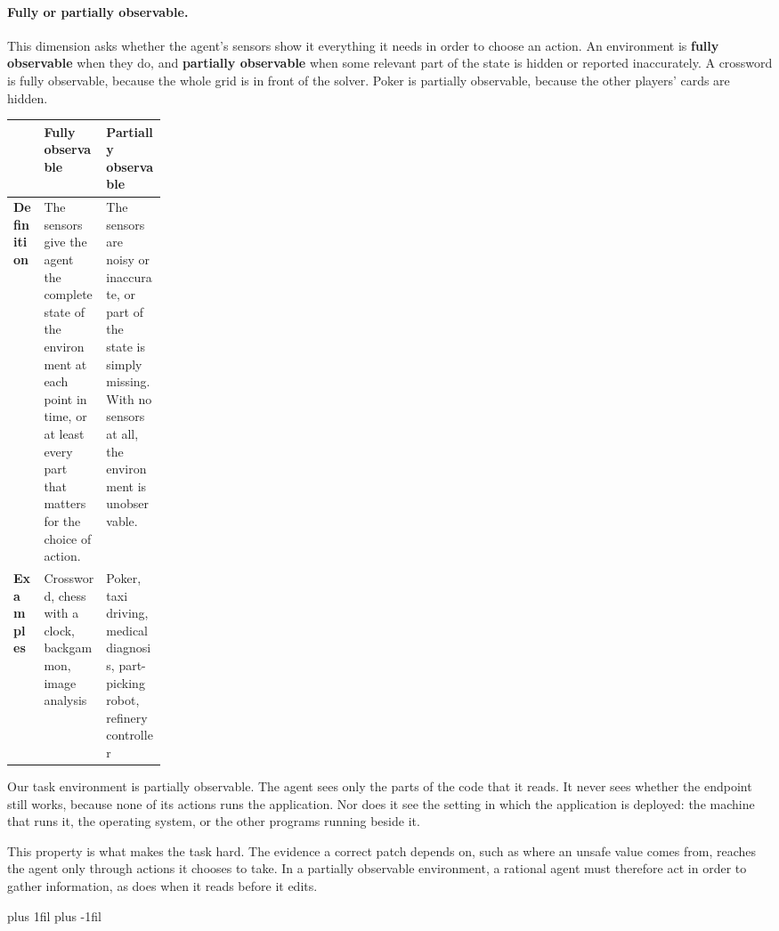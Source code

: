 \paragraph{Fully or partially observable.}\leavevmode\par\nopagebreak
This dimension asks whether the agent's sensors show it everything it needs in order to choose an
action. An environment is \textbf{fully observable} when they do, and \textbf{partially observable}
when some relevant part of the state is hidden or reported inaccurately. A crossword is fully
observable, because the whole grid is in front of the solver. Poker is partially observable,
because the other players' cards are hidden.
\par\nopagebreak\smallskip
\noindent\begin{adjustbox}{width=\linewidth}\begin{tabularx}{\linewidth}{L{0.2\linewidth}XX}
  \toprule
  & \textbf{Fully observable} & \textbf{Partially observable} \\
  \midrule
  \textbf{Definition} & The sensors give the agent the complete state of the environment at each
  point in time, or at least every part that matters for the choice of action. & The sensors are
  noisy or inaccurate, or part of the state is simply missing. With no sensors at all, the
  environment is unobservable. \\
  \textbf{Examples} & Crossword, chess with a clock, backgammon, image analysis & Poker, taxi
  driving, medical diagnosis, part-picking robot, refinery controller \\
  \bottomrule
\end{tabularx}\end{adjustbox}\par
Our task environment is partially observable. The agent sees only the parts of the code that it
reads. It never sees whether the endpoint still works, because none of its actions runs the
application. Nor does it see the setting in which the application is deployed: the machine that
runs it, the operating system, or the other programs running beside it.

This property is what makes the task hard. The evidence a correct patch depends on, such as where
an unsafe value comes from, reaches the agent only through actions it chooses to take. In a
partially observable environment, a rational agent must therefore act in order to gather
information, as \msa{} does when it reads before it edits.

\par\vskip 0pt plus 1fil\vskip 0pt plus -1fil\relax
